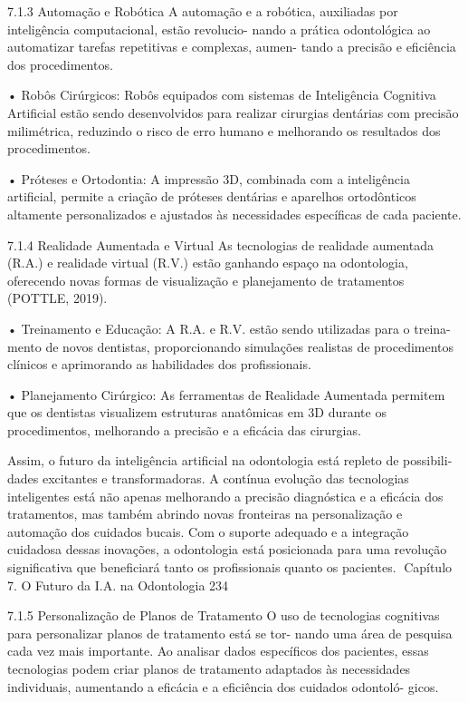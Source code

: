 7.1.3     Automação e Robótica
A automação e a robótica, auxiliadas por inteligência computacional, estão revolucio-
nando a prática odontológica ao automatizar tarefas repetitivas e complexas, aumen-
tando a precisão e eficiência dos procedimentos.

    • Robôs Cirúrgicos: Robôs equipados com sistemas de Inteligência Cognitiva
      Artificial estão sendo desenvolvidos para realizar cirurgias dentárias com precisão
      milimétrica, reduzindo o risco de erro humano e melhorando os resultados dos
      procedimentos.

    • Próteses e Ortodontia: A impressão 3D, combinada com a inteligência artificial,
      permite a criação de próteses dentárias e aparelhos ortodônticos altamente
      personalizados e ajustados às necessidades específicas de cada paciente.

7.1.4     Realidade Aumentada e Virtual
As tecnologias de realidade aumentada (R.A.) e realidade virtual (R.V.) estão ganhando
espaço na odontologia, oferecendo novas formas de visualização e planejamento de
tratamentos (POTTLE, 2019).

    • Treinamento e Educação: A R.A. e R.V. estão sendo utilizadas para o treina-
      mento de novos dentistas, proporcionando simulações realistas de procedimentos
      clínicos e aprimorando as habilidades dos profissionais.

    • Planejamento Cirúrgico: As ferramentas de Realidade Aumentada permitem que
      os dentistas visualizem estruturas anatômicas em 3D durante os procedimentos,
      melhorando a precisão e a eficácia das cirurgias.

        Assim, o futuro da inteligência artificial na odontologia está repleto de possibili-
dades excitantes e transformadoras. A contínua evolução das tecnologias inteligentes
está não apenas melhorando a precisão diagnóstica e a eficácia dos tratamentos, mas
também abrindo novas fronteiras na personalização e automação dos cuidados bucais.
Com o suporte adequado e a integração cuidadosa dessas inovações, a odontologia
está posicionada para uma revolução significativa que beneficiará tanto os profissionais
quanto os pacientes.
Capítulo 7. O Futuro da I.A. na Odontologia                                           234


7.1.5     Personalização de Planos de Tratamento
O uso de tecnologias cognitivas para personalizar planos de tratamento está se tor-
nando uma área de pesquisa cada vez mais importante. Ao analisar dados específicos
dos pacientes, essas tecnologias podem criar planos de tratamento adaptados às
necessidades individuais, aumentando a eficácia e a eficiência dos cuidados odontoló-
gicos.

